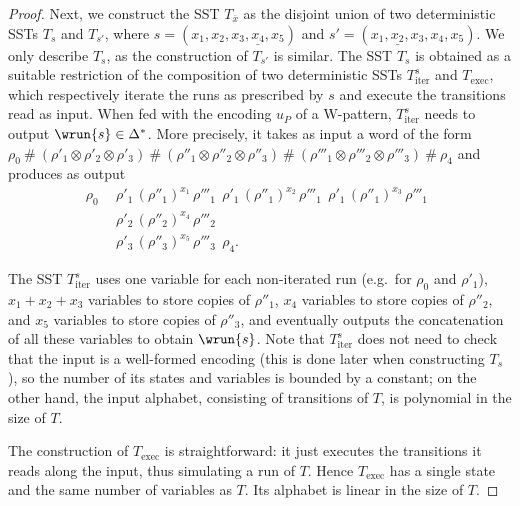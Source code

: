 \documentclass{article}
\begin{document}
\begin{proof}
    Next, we construct the SST $T_{\overline x}$ 
    as the disjoint union of two
    deterministic SSTs $T_s$ and $T_{s'}$, 
    where $s = (x_1,x_2,x_3,\underline{x_4},x_5)$ and 
    $s' = (x_1,\underline{x_2},x_3,x_4,x_5)$. 
    We only describe $T_s$, as the construction of 
    $T_{s'}$ is similar. 
    The SST $T_s$ is obtained as a suitable restriction of 
    the composition of two deterministic SSTs 
    $T_{\mathrm{iter}}^s$ and $T_{\mathrm{exec}}$, 
    which respectively iterate the runs as 
    prescribed by $s$ and execute the 
    transitions read as input. 
    When fed with the encoding $u_P$ of a W-pattern, 
    $T_{\mathrm{iter}}^s$ needs to output $\wrun{s}\in\Delta^*$.
    More precisely, it takes as input a word of the form 
	$
	  \rho_0 \:\#\: 
	  (\rho'_1 \otimes \rho'_2 \otimes \rho'_3) \:\#\:
	  (\rho''_1 \otimes \rho''_2 \otimes \rho''_3) \:\#\:
	  (\rho'''_1 \otimes \rho'''_2 \otimes \rho'''_3) \:\#\:
	  \rho_4
    $
    and produces as output
    \[
    \begin{aligned}
      \rho_0 ~~
      & \rho'_1 \, (\rho''_1)^{x_1} \, \rho'''_1 ~~ 
        \rho'_1 \, (\rho''_1)^{x_2} \, \rho'''_1 ~~ 
        \rho'_1 \, (\rho''_1)^{x_3} \, \rho'''_1 ~~ \\
      & \rho'_2 \, (\rho''_2)^{x_4} \, \rho'''_2 ~~ \\
      & \rho'_3 \, (\rho''_3)^{x_5} \, \rho'''_3 ~~ \rho_4.
	\end{aligned}
    \]

    The SST $T_{\mathrm{iter}}^s$ uses one variable for each
    non-iterated run (e.g.~for $\rho_0$ and $\rho'_1$),
    $x_1+x_2+x_3$ variables to
    store copies of $\rho''_1$, $x_4$ variables to store copies of
    $\rho''_2$, and $x_5$ variables to store copies of $\rho''_3$, and
    eventually outputs the concatenation of all these variables to obtain
    $\wrun{s}$. Note that $T_{\mathrm{iter}}^s$ does not 
	need to check that the input is a well-formed encoding (this is done later when constructing $T_s$), 
	so the number of its states and variables is bounded
	by a constant;
	on the other hand, the input alphabet, consisting
	of transitions of $T$, is polynomial in the size of $T$.
        
    The construction of $T_{\mathrm{exec}}$ is straightforward:
    it just executes the transitions it reads along the input, 
    thus simulating a run of $T$. 
    Hence $T_{\mathrm{exec}}$ has a single state and the same 
    number of variables as $T$. Its alphabet is linear in 
    the size of $T$. 
	

\end{proof}
\end{document}
